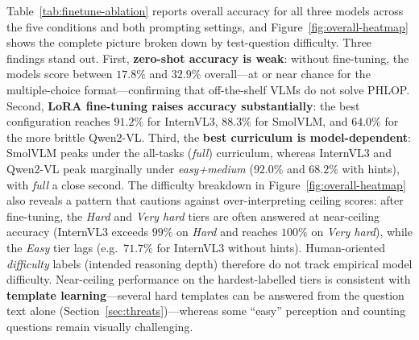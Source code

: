 \documentclass[conference]{IEEEtran}
\begin{document}
Table~\ref{tab:finetune-ablation} reports overall accuracy for all three models across the five conditions and both prompting settings, and Figure~\ref{fig:overall-heatmap} shows the complete picture broken down by test-question difficulty. Three findings stand out. First, \textbf{zero-shot accuracy is weak}: without fine-tuning, the models score between $17.8\%$ and $32.9\%$ overall---at or near chance for the multiple-choice format---confirming that off-the-shelf VLMs do not solve PHLOP. Second, \textbf{LoRA fine-tuning raises accuracy substantially}: the best configuration reaches $91.2\%$ for InternVL3, $88.3\%$ for SmolVLM, and $64.0\%$ for the more brittle Qwen2-VL. Third, the \textbf{best curriculum is model-dependent}: SmolVLM peaks under the all-tasks (\textit{full}) curriculum, whereas InternVL3 and Qwen2-VL peak marginally under \textit{easy+medium} ($92.0\%$ and $68.2\%$ with hints), with \textit{full} a close second. The difficulty breakdown in Figure~\ref{fig:overall-heatmap} also reveals a pattern that cautions against over-interpreting ceiling scores: after fine-tuning, the \emph{Hard} and \emph{Very hard} tiers are often answered at near-ceiling accuracy (InternVL3 exceeds $99\%$ on \emph{Hard} and reaches $100\%$ on \emph{Very hard}), while the \emph{Easy} tier lags (e.g.\ $71.7\%$ for InternVL3 without hints). Human-oriented \emph{difficulty} labels (intended reasoning depth) therefore do not track empirical model difficulty. Near-ceiling performance on the hardest-labelled tiers is consistent with \textbf{template learning}---several hard templates can be answered from the question text alone (Section~\ref{sec:threats})---whereas some ``easy'' perception and counting questions remain visually challenging.
\end{document}
